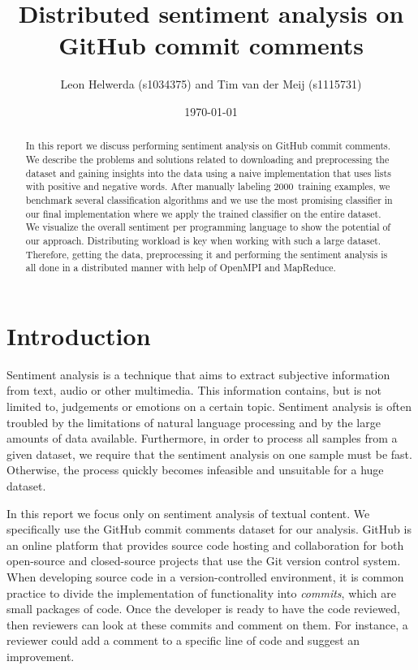 \documentclass{article}
\begin{document}
\title{Distributed sentiment analysis on GitHub commit comments}
\author{Leon Helwerda (s1034375) and Tim van der Meij (s1115731)}
\date{\today}
\maketitle

\begin{abstract}
  In this report we discuss performing sentiment analysis on GitHub commit
  comments. We describe the problems and solutions related to downloading and
  preprocessing the dataset and gaining insights into the data using a naive
  implementation that uses lists with positive and negative words. After
  manually labeling 2000~training examples, we benchmark several classification
  algorithms and we use the most promising classifier in our final
  implementation where we apply the trained classifier on the entire dataset.
  We visualize the overall sentiment per programming language to show the
  potential of our approach. Distributing workload is key when working with 
  such a large dataset. Therefore, getting the data, preprocessing it and 
  performing the sentiment analysis is all done in a distributed manner with 
  help of OpenMPI and MapReduce.
\end{abstract}

\section{Introduction}\label{sec:introduction}
Sentiment analysis is a technique that aims to extract subjective information
from text, audio or other multimedia. This information contains, but is not
limited to, judgements or emotions on a certain topic. Sentiment analysis is
often troubled by the limitations of natural language processing and by the
large amounts of data available. Furthermore, in order to process all samples 
from a given dataset, we require that the sentiment analysis on one sample must 
be fast. Otherwise, the process quickly becomes infeasible and unsuitable for a
huge dataset.

In this report we focus only on sentiment analysis of textual content. We 
specifically use the GitHub commit comments dataset for our analysis. GitHub is 
an online platform that provides source code hosting and collaboration for both 
open-source and closed-source projects that use the Git version control system. 
When developing source code in a version-controlled environment, it is common 
practice to divide the implementation of functionality into \emph{commits}, 
which are small packages of code. Once the developer is ready to have the code 
reviewed, then reviewers can look at these commits and comment on them. For 
instance, a reviewer could add a comment to a specific line of code and suggest 
an improvement.
\end{document}
